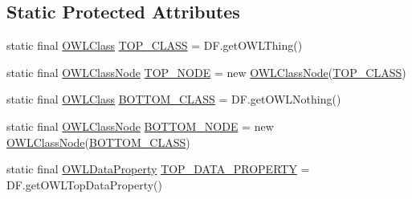 \subsection*{Static Protected Attributes}
\begin{DoxyCompactItemize}
\item 
static final \hyperlink{interfaceorg_1_1semanticweb_1_1owlapi_1_1model_1_1_o_w_l_class}{O\-W\-L\-Class} \hyperlink{classorg_1_1semanticweb_1_1owlapi_1_1reasoner_1_1impl_1_1_default_node_3_01_e_01extends_01_o_w_l_object_01_4_aa366e844c36b5699e227d2fcb8d36736}{T\-O\-P\-\_\-\-C\-L\-A\-S\-S} = D\-F.\-get\-O\-W\-L\-Thing()
\item 
static final \hyperlink{classorg_1_1semanticweb_1_1owlapi_1_1reasoner_1_1impl_1_1_o_w_l_class_node}{O\-W\-L\-Class\-Node} \hyperlink{classorg_1_1semanticweb_1_1owlapi_1_1reasoner_1_1impl_1_1_default_node_3_01_e_01extends_01_o_w_l_object_01_4_afb8ed6b65ebbe322ef09917d6664c3ca}{T\-O\-P\-\_\-\-N\-O\-D\-E} = new \hyperlink{classorg_1_1semanticweb_1_1owlapi_1_1reasoner_1_1impl_1_1_o_w_l_class_node}{O\-W\-L\-Class\-Node}(\hyperlink{classorg_1_1semanticweb_1_1owlapi_1_1reasoner_1_1impl_1_1_default_node_3_01_e_01extends_01_o_w_l_object_01_4_aa366e844c36b5699e227d2fcb8d36736}{T\-O\-P\-\_\-\-C\-L\-A\-S\-S})
\item 
static final \hyperlink{interfaceorg_1_1semanticweb_1_1owlapi_1_1model_1_1_o_w_l_class}{O\-W\-L\-Class} \hyperlink{classorg_1_1semanticweb_1_1owlapi_1_1reasoner_1_1impl_1_1_default_node_3_01_e_01extends_01_o_w_l_object_01_4_af1c88af65739559e274584d9391e92af}{B\-O\-T\-T\-O\-M\-\_\-\-C\-L\-A\-S\-S} = D\-F.\-get\-O\-W\-L\-Nothing()
\item 
static final \hyperlink{classorg_1_1semanticweb_1_1owlapi_1_1reasoner_1_1impl_1_1_o_w_l_class_node}{O\-W\-L\-Class\-Node} \hyperlink{classorg_1_1semanticweb_1_1owlapi_1_1reasoner_1_1impl_1_1_default_node_3_01_e_01extends_01_o_w_l_object_01_4_afc97863bef2aae03f426d2c399ee7233}{B\-O\-T\-T\-O\-M\-\_\-\-N\-O\-D\-E} = new \hyperlink{classorg_1_1semanticweb_1_1owlapi_1_1reasoner_1_1impl_1_1_o_w_l_class_node}{O\-W\-L\-Class\-Node}(\hyperlink{classorg_1_1semanticweb_1_1owlapi_1_1reasoner_1_1impl_1_1_default_node_3_01_e_01extends_01_o_w_l_object_01_4_af1c88af65739559e274584d9391e92af}{B\-O\-T\-T\-O\-M\-\_\-\-C\-L\-A\-S\-S})
\item 
static final \hyperlink{interfaceorg_1_1semanticweb_1_1owlapi_1_1model_1_1_o_w_l_data_property}{O\-W\-L\-Data\-Property} \hyperlink{classorg_1_1semanticweb_1_1owlapi_1_1reasoner_1_1impl_1_1_default_node_3_01_e_01extends_01_o_w_l_object_01_4_a5db484a55bcd56e92ff1ad5d3f35d690}{T\-O\-P\-\_\-\-D\-A\-T\-A\-\_\-\-P\-R\-O\-P\-E\-R\-T\-Y} = D\-F.\-get\-O\-W\-L\-Top\-Data\-Property()

\end{DoxyCompactItemize}
